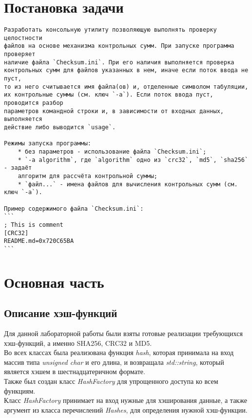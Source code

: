 \documentclass[a4paper, 12pt]{article}
\begin{document}
\cleardoublepage
\section*{Постановка задачи}

\begin{verbatim}
Разработать консольную утилиту позволяющую выполнять проверку целостности 
файлов на основе механизма контрольных сумм. При запуске программа проверяет 
наличие файла `Checksum.ini`. При его наличия выполняется проверка 
контрольных сумм для файлов указанных в нем, иначе если поток ввода не пуст, 
то из него считывается имя файла(ов) и, отделенные символом табуляции, 
их контрольные суммы (см. ключ `-a`). Если поток ввода пуст, проводится разбор 
параметров командной строки и, в зависимости от входных данных, выполняется 
действие либо выводится `usage`. 

Режимы запуска программы:
    * без параметров - использование файла `Checksum.ini`;
    * `-a algorithm`, где `algorithm` одно из `crc32`, `md5`, `sha256` - задаёт 
    алгоритм для рассчёта контрольной суммы;
    * `файл...` - имена файлов для вычисления контрольных сумм (см. ключ `-a`).

Пример содержимого файла `Checksum.ini`:
``` 
; This is comment 
[CRC32] 
README.md=0x720C65BA 
``` 
\end{verbatim}

\cleardoublepage



\section*{Основная часть}

\subsection{Описание хэш-функций}
Для данной лабораторной работы были взяты готовые реализации требующихся
хэш-функций, а именно SHA256, CRC32 и MD5. \\
Во всех классах была реализована функция \textit{hash}, которая принимала на вход
массив типа \textit{unsigned char} и его длина, и возвращала \textit{std::string},
который является хэшем в шестнадцатеричном формате. \\
Также был создан класс \textit{HashFactory} для упрощенного доступа ко всем функциям. \\
Класс \textit{HashFactory} принимает на вход нужные для хэширования данные, 
а также аргумент из класса перечислений \textit{Hashes}, для определения
нужной хэш-функции.
\end{document}
